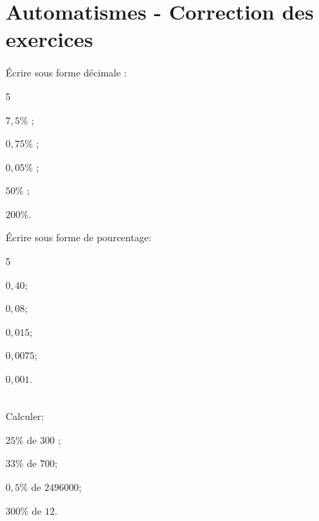 \documentclass[a4paper,10pt]{book}        %
\begin{document}
\vspace{-0.6 cm}
\chapter{Automatismes - Correction des exercices}
\thispagestyle{fancy}

\vspace{-0.8 cm}
\begin{enumMet}
	\item Écrire sous forme décimale :
	\begin{enumMet}
		\begin{multicols}{5}
			\item $7,5 \%$ ;
		\item $0,75\%$ ;
		\item $0,05\%$ ;
		\item $50\%$ ;
		\item $200\%$.
		\end{multicols}
	\end{enumMet}
	\item Écrire sous forme de pourcentage:
	\begin{enumMet}
		\begin{multicols}{5}
			\item $0,40$;
		\item $0,08$;
		\item $0,015$;
		\item $0,0075$;
		\item $0,001$.
		\end{multicols}
	\end{enumMet}
\end{enumMet}
	
	\\
	Calculer:
		\begin{enumMet}
			\item $25 \%$ de $300$ ;
			\item $33 \%$ de $700$;
			\item $0,5 \%$ de $2 496 000$;
			\item $300 \%$ de $12$.
		\end{enumMet}
\end{document}
